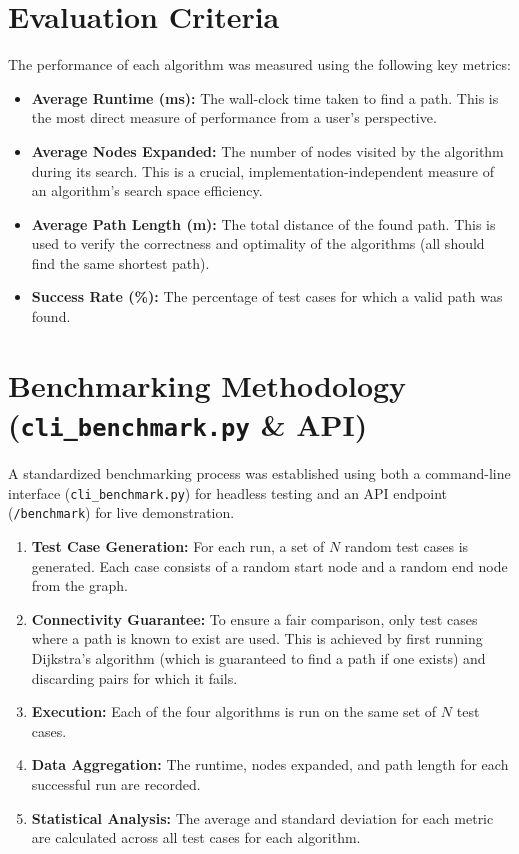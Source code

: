 \documentclass[12pt, a4paper]{report}
\begin{document}
\section{Evaluation Criteria}
The performance of each algorithm was measured using the following key metrics:
\begin{itemize}
    \item \textbf{Average Runtime (ms):} The wall-clock time taken to find a path. This is the most direct measure of performance from a user's perspective.
    \item \textbf{Average Nodes Expanded:} The number of nodes visited by the algorithm during its search. This is a crucial, implementation-independent measure of an algorithm's search space efficiency.
    \item \textbf{Average Path Length (m):} The total distance of the found path. This is used to verify the correctness and optimality of the algorithms (all should find the same shortest path).
    \item \textbf{Success Rate (\%):} The percentage of test cases for which a valid path was found.
\end{itemize}

\section{Benchmarking Methodology (\texttt{cli\_benchmark.py} \& API)}
A standardized benchmarking process was established using both a command-line interface (\texttt{cli\_benchmark.py}) for headless testing and an API endpoint (\texttt{/benchmark}) for live demonstration.
\begin{enumerate}
    \item \textbf{Test Case Generation:} For each run, a set of $N$ random test cases is generated. Each case consists of a random start node and a random end node from the graph.
    \item \textbf{Connectivity Guarantee:} To ensure a fair comparison, only test cases where a path is known to exist are used. This is achieved by first running Dijkstra's algorithm (which is guaranteed to find a path if one exists) and discarding pairs for which it fails.
    \item \textbf{Execution:} Each of the four algorithms is run on the same set of $N$ test cases.
    \item \textbf{Data Aggregation:} The runtime, nodes expanded, and path length for each successful run are recorded.
    \item \textbf{Statistical Analysis:} The average and standard deviation for each metric are calculated across all test cases for each algorithm.
\end{enumerate}
\end{document}
